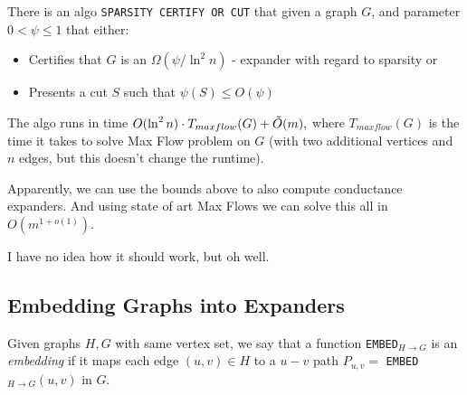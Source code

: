 \begin{izrek}
    There is an algo \texttt{SPARSITY CERTIFY OR CUT} that given a graph $G$, and parameter $0 < \psi \leq 1$ that either:

    \begin{itemize}
        \item Certifies that $G$ is an $\Omega (\psi / \ln ^2 n)$ - expander with regard to sparsity or

        \item Presents a cut $S$ such that $\psi(S) \leq O(\psi)$
    \end{itemize}
    The algo runs in time $O(\ln ^2 n) \cdot T_{max flow}(G) + \Tilde{O}(m),$
    where $T_{max flow}(G)$ is the time it takes to solve Max Flow problem on $G$ (with two additional vertices and $n$ edges, but this doesn't change the runtime).
\end{izrek}

Apparently, we can use the bounds above to also compute conductance expanders. And using state of art Max Flows we can solve this all in $O(m^{1 + o(1)}).$

I have no idea how it should work, but oh well.

\subsection{Embedding Graphs into Expanders}

\begin{definicija}
    Given graphs $H, G$ with same vertex set, we say that a function \texttt{EMBED}$_{H \rightarrow G}$ is an \textit{embedding} if it maps each edge $(u,v) \in H$ to a $u-v$ path $P_{u,v} = $ \texttt{EMBED}$_{H \rightarrow G}(u,v)$ in $G$.
\end{definicija}


